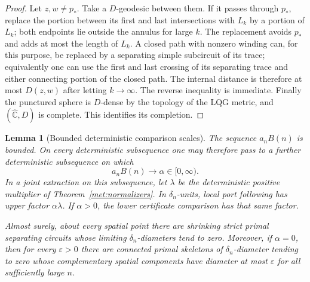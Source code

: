 \documentclass[11pt]{article}
\numberwithin{equation}{section}
\newtheorem{lemma}[theorem]{Lemma}
\theoremstyle{definition}
\theoremstyle{remark}
\newcommand{\1}{\mathbf 1}
\begin{document}
\begin{proof}
Let $z,w\ne p_*$.  Take a $D$-geodesic between them.  If it passes
through $p_*$, replace the portion between its first and last
intersections with $L_k$ by a portion of $L_k$; both endpoints lie
outside the annulus for large $k$.  The replacement avoids $p_*$ and
adds at most the length of $L_k$.  A closed path with nonzero winding
can, for this purpose, be replaced by a separating simple subcircuit
of its trace; equivalently one can use the first and last crossing
of its separating trace and either connecting portion of the closed
path.  The internal distance is therefore at most $D(z,w)$ after
letting $k\to\infty$.  The reverse inequality is immediate.
Finally the punctured sphere is $D$-dense by the topology of the LQG
metric, and $(\widehat{\mathbb C},D)$ is complete.  This identifies its completion.
\end{proof}

\begin{lemma}[Bounded deterministic comparison scales]
\label{comp:scales}
The sequence $a_nB(n)$ is bounded.  On every deterministic subsequence
one may therefore pass to a further deterministic subsequence on
which
\begin{equation}
 \label{comp:alpha}
 a_nB(n)\longrightarrow\alpha\in[0,\infty).
\end{equation}
In a joint extraction on this subsequence, let $\lambda$ be the
deterministic positive multiplier of
Theorem~\ref{met:normalizers}.  In $\delta_n$-units, local port
following has upper factor $\alpha\lambda$.  If $\alpha>0$, the
lower certificate comparison has that same factor.

Almost surely, about every spatial point there are shrinking strict
primal separating circuits whose limiting $\delta_n$-diameters tend
to zero.  Moreover, if $\alpha=0$, then for every $\varepsilon>0$
there are connected primal skeletons of $\delta_n$-diameter tending
to zero whose complementary spatial components have diameter at
most $\varepsilon$ for all sufficiently large $n$.
\end{lemma}
\end{document}
